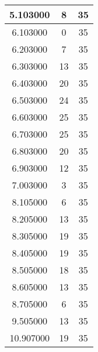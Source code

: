 \begin{longtable}[htbp]{|c|c|c|}
5.103000 & 8 & 35 \\ \hline
6.103000 & 0 & 35 \\ \hline
6.203000 & 7 & 35 \\ \hline
6.303000 & 13 & 35 \\ \hline
6.403000 & 20 & 35 \\ \hline
6.503000 & 24 & 35 \\ \hline
6.603000 & 25 & 35 \\ \hline
6.703000 & 25 & 35 \\ \hline
6.803000 & 20 & 35 \\ \hline
6.903000 & 12 & 35 \\ \hline
7.003000 & 3 & 35 \\ \hline
8.105000 & 6 & 35 \\ \hline
8.205000 & 13 & 35 \\ \hline
8.305000 & 19 & 35 \\ \hline
8.405000 & 19 & 35 \\ \hline
8.505000 & 18 & 35 \\ \hline
8.605000 & 13 & 35 \\ \hline
8.705000 & 6 & 35 \\ \hline
9.505000 & 13 & 35 \\ \hline
10.907000 & 19 & 35 \\ \hline
\end{longtable}
